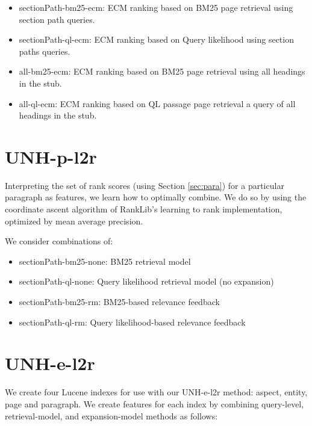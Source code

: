 \documentclass{article}
\begin{document}
\begin{itemize}
\item sectionPath-bm25-ecm: ECM ranking based on BM25 page retrieval using section path queries.
\item sectionPath-ql-ecm: ECM ranking based on Query likelihood using section paths queries.
\item all-bm25-ecm: ECM ranking based on BM25 page retrieval using all headings in the stub.
\item all-ql-ecm: ECM ranking based on QL passage page retrieval a query of all headings in the stub.

    \end{itemize}


\section{UNH-p-l2r}

Interpreting the set of rank scores (using Section \ref{sec:para}) for a particular paragraph as features, we learn how to optimally combine. We do so by using the coordinate ascent algorithm of RankLib's learning to rank implementation, optimized by mean average precision. 

We consider combinations of:
\begin{itemize}
    \item sectionPath-bm25-none: BM25 retrieval model
    \item sectionPath-ql-none: Query likelihood retrieval model (no expansion)
    \item sectionPath-bm25-rm: BM25-based relevance feedback
    \item sectionPath-ql-rm: Query likelihood-based relevance feedback
\end{itemize}

\section{UNH-e-l2r}

We create four Lucene indexes for use with our UNH-e-l2r method: aspect, entity, page and paragraph. We create features for each index by combining query-level, retrieval-model, and expansion-model methods as follows:
\end{document}
